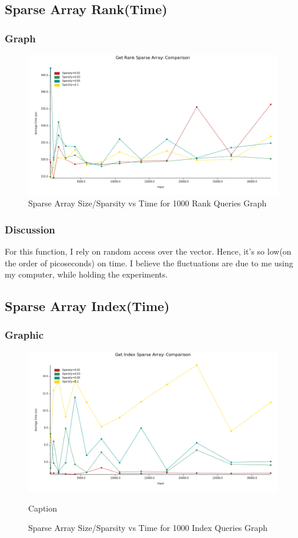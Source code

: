 \documentclass{report}
\begin{document}
\newpage

\subsection*{Sparse Array Rank(Time)}
\subsubsection*{Graph}
\begin{figure}[h!]
    \centering
    \includegraphics[scale=0.5]{get_rank_size_vs_sparsity.png}
    \caption{Sparse Array Size/Sparsity vs Time for 1000 Rank Queries Graph}
    \label{fig:my_label}
\end{figure}
\subsubsection*{Discussion}
For this function, I rely on random access over the vector. Hence, it's so low(on the order of picoseconds) on time. I believe the fluctuations are due to me using my computer, while holding the experiments. 
\newpage

\subsection*{Sparse Array Index(Time)}
\subsubsection*{Graphic}
\begin{figure}[h!]
    \centering
    \includegraphics[scale=0.5]{get_index_size_sparsity.png}
    \caption{Caption}
    \caption{Sparse Array Size/Sparsity vs Time for 1000 Index Queries Graph}
\end{figure}
\end{document}
